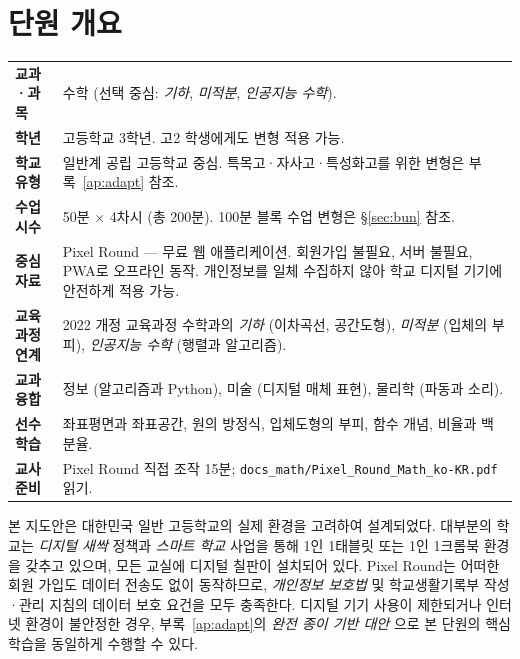 \documentclass[12pt,a4paper]{scrartcl}
\begin{document}
\renewcommand{\contentsname}{\color{accent}목\quad 차}
\tableofcontents
\thispagestyle{fancy}
\newpage

\section{단원 개요}

\begin{center}
\begin{tabular}{@{}p{}p{}@{}}
\toprule
\textbf{교과·과목} & 수학 (선택 중심: \emph{기하}, \emph{미적분}, \emph{인공지능 수학}). \\
\addlinespace[2pt]
\textbf{학년} & 고등학교 3학년. 고2 학생에게도 변형 적용 가능. \\
\addlinespace[2pt]
\textbf{학교 유형} & 일반계 공립 고등학교 중심. 특목고·자사고·특성화고를 위한 변형은 부록~\ref{ap:adapt} 참조. \\
\addlinespace[2pt]
\textbf{수업 시수} & 50분 × 4차시 (총 200분). 100분 블록 수업 변형은 §\ref{sec:bun} 참조. \\
\addlinespace[2pt]
\textbf{중심 자료} & Pixel Round --- 무료 웹 애플리케이션. 회원가입 불필요, 서버 불필요, PWA로 오프라인 동작. 개인정보를 일체 수집하지 않아 학교 디지털 기기에 안전하게 적용 가능. \\
\addlinespace[2pt]
\textbf{교육과정 연계} & 2022 개정 교육과정 수학과의 \emph{기하} (이차곡선, 공간도형), \emph{미적분} (입체의 부피), \emph{인공지능 수학} (행렬과 알고리즘). \\
\addlinespace[2pt]
\textbf{교과 융합} & 정보 (알고리즘과 Python), 미술 (디지털 매체 표현), 물리학 (파동과 소리). \\
\addlinespace[2pt]
\textbf{선수 학습} & 좌표평면과 좌표공간, 원의 방정식, 입체도형의 부피, 함수 개념, 비율과 백분율. \\
\addlinespace[2pt]
\textbf{교사 준비} & Pixel Round 직접 조작 15분; \texttt{docs\_math/Pixel\_Round\_Math\_ko-KR.pdf} 읽기. \\
\bottomrule
\end{tabular}
\end{center}

\begin{yuui}[실시 환경에 관한 고려]
본 지도안은 대한민국 일반 고등학교의 실제 환경을 고려하여 설계되었다. 대부분의 학교는 \emph{디지털 새싹} 정책과 \emph{스마트 학교} 사업을 통해 1인 1태블릿 또는 1인 1크롬북 환경을 갖추고 있으며, 모든 교실에 디지털 칠판이 설치되어 있다. Pixel Round는 어떠한 회원 가입도 데이터 전송도 없이 동작하므로, \emph{개인정보 보호법} 및 학교생활기록부 작성·관리 지침의 데이터 보호 요건을 모두 충족한다. 디지털 기기 사용이 제한되거나 인터넷 환경이 불안정한 경우, 부록~\ref{ap:adapt}의 \emph{완전 종이 기반 대안} 으로 본 단원의 핵심 학습을 동일하게 수행할 수 있다.
\end{yuui}
\end{document}
